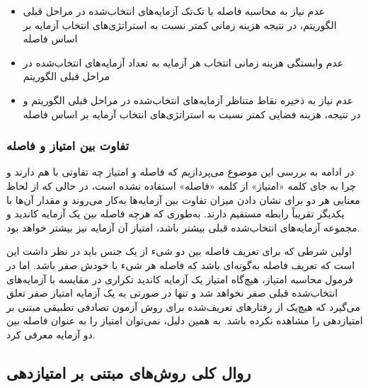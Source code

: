 \begin{itemize}
	\item عدم نیاز به محاسبه فاصله با تک‌تک آزمایه‌های انتخاب‌شده در مراحل قبلی الگوریتم، در نتیجه هزینه زمانی کمتر نسبت به استراتژی‌های انتخاب آزمایه بر اساس فاصله
	\item عدم وابستگی هزینه زمانی انتخاب هر آزمایه به تعداد آزمایه‌های انتخاب‌شده در مراحل قبلی الگوریتم
	\item عدم نیاز به ذخیره نقاط متناظر آزمایه‌های انتخاب‌شده در مراحل قبلی الگوریتم و در نتیجه، هزینه فضایی کمتر نسبت به استراتژی‌های انتخاب آزمایه بر اساس فاصله
\end{itemize}


\subsubsection{تفاوت بین امتیاز و فاصله}

در ادامه به بررسی این موضوع می‌پردازیم که فاصله و امتیاز چه تفاوتی با هم دارند و چرا به جای کلمه «امتیاز» از کلمه «فاصله» استفاده نشده است، در حالی که از لحاظ معنایی هر دو برای نشان دادن میزان تفاوت بین آزمایه‌ها به‌کار می‌روند و مقدار آن‌ها با یکدیگر تقریباً رابطه مستقیم دارند. به‌طوری که هرچه فاصله بین یک آزمایه کاندید و مجموعه آزمایه‌های انتخاب‌شده قبلی بیشتر باشد، امتیاز آن آزمایه نیز بیشتر خواهد بود.

اولین شرطی که برای تعریف فاصله بین دو شیء از یک جنس باید در نظر داشت این است که تعریف فاصله به‌گونه‌ای باشد که فاصله هر شیء با خودش صفر باشد. اما در فرمول محاسبه امتیاز، هیچ‌گاه امتیاز یک آزمایه کاندید تکراری در مقایسه با آزمایه‌های انتخاب‌شده قبلی صفر نخواهد شد و تنها در صورتی به یک آزمایه امتیاز صفر تعلق می‌گیرد که هیچ‌یک از رفتارهای تعریف‌شده برای روش آزمون تصادفی تطبیقی مبتنی بر امتیازدهی را مشاهده نکرده باشد. به همین دلیل، نمی‌توان امتیاز را به عنوان فاصله بین دو آزمایه معرفی کرد.

\subsection{روال کلی روش‌های مبتنی بر امتیازدهی}


